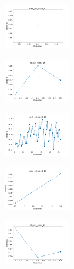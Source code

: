 \begin{figure}[H]
\begin{subfigure}
    \end{subfigure}
    \hfill
    \begin{subfigure}
        \centering
        \includegraphics[width=0.32\textwidth]{img/copkm/rand_set_const_10_589741062_time.png}
    \end{subfigure}
    \hfill
    \begin{subfigure}
        \centering
        \includegraphics[width=0.32\textwidth]{img/copkm/iris_set_const_10_277451237_time.png}
    \end{subfigure}
    \hfill
    \begin{subfigure}
        \centering
        \includegraphics[width=0.32\textwidth]{img/copkm/ecoli_set_const_10_277451237_time.png}
    \end{subfigure}
    \hfill
    \begin{subfigure}
        \centering
        \includegraphics[width=0.32\textwidth]{img/copkm/rand_set_const_10_277451237_time.png}
    \end{subfigure}
    \hfill
    \begin{subfigure}
        \centering
        \includegraphics[width=0.32\textwidth]{img/copkm/iris_set_const_10_49258669_time.png}

\end{subfigure}
\end{figure}
